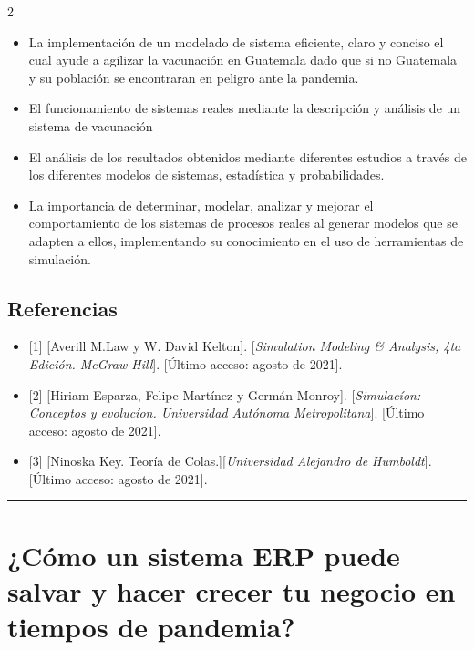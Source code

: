 \documentclass[12pt,spanish,Letterpaper,openany]{book}
\newcommand{\HRule}{\begin{center}\rule{0.5\linewidth}{0.2mm}\end{center}}
\begin{document}
\begin {multicols}{2}
\begin{itemize}
\item
  La implementación de un modelado de sistema eficiente, claro y conciso el cual ayude
  a agilizar la vacunación en Guatemala dado que si no Guatemala y su población se
  encontraran en peligro ante la pandemia.
\item
  El funcionamiento de sistemas reales mediante la descripción y análisis de un sistema
  de vacunación
\item
  El análisis de los resultados obtenidos mediante diferentes estudios a través de los
  diferentes modelos de sistemas, estadística y probabilidades.
\item
  La importancia de determinar, modelar, analizar y mejorar el comportamiento de los
  sistemas de procesos reales al generar modelos que se adapten a ellos, implementando
  su conocimiento en el uso de herramientas de simulación.
\end{itemize}

\hypertarget{referencias-12}{%
\section{Referencias}\label{referencias-12}}

\begin{itemize}
\item
  {[}1{]} {[}Averill M.Law y W. David Kelton{]}. {[}\emph{Simulation Modeling \& Analysis, 4ta Edición. McGraw Hill}{]}. {[}Último acceso: agosto de 2021{]}.
\item
  {[}2{]} {[}Hiriam Esparza, Felipe Martínez y Germán Monroy{]}. {[}\emph{Simulacíon: Conceptos y evolucíon. Universidad Autónoma Metropolitana}{]}. {[}Último acceso: agosto de 2021{]}.
\item
  {[}3{]} {[}Ninoska Key. Teoría de Colas.{]}{[}\emph{Universidad Alejandro de Humboldt}{]}. {[}Último acceso: agosto de 2021{]}.
\end{itemize}

\end {multicols}

\medskip

\HRule

\medskip

\hypertarget{pareja38}{%
\chapter{¿Cómo un sistema ERP puede salvar y hacer crecer tu negocio en tiempos de pandemia?}\label{pareja38}}
\end{document}
